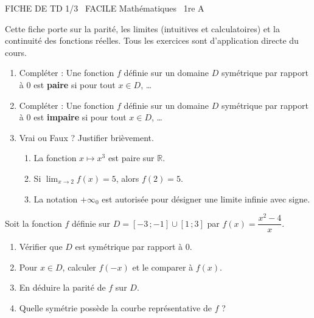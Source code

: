 \documentclass[11pt]{article}
\begin{document}
\begin{tcolorbox}[enhanced,colback=popink,colframe=popink,arc=10pt,boxrule=0pt,left=12pt,right=12pt,top=9pt,bottom=9pt]
{\color{white}\popxbold\small FICHE DE TD 1/3 \textbullet\ FACILE \hfill Mathématiques \textbullet\ 1re A\par}
\end{tcolorbox}
\vspace{4pt}
\noindent Cette fiche porte sur la parité, les limites (intuitives et calculatoires) et la continuité des fonctions réelles. Tous les exercices sont d'application directe du cours.

\begin{exercice}
\begin{enumerate}
    \item Compléter : Une fonction $f$ définie sur un domaine $D$ symétrique par rapport à $0$ est \textbf{paire} si pour tout $x \in D$, \dots
    \item Compléter : Une fonction $f$ définie sur un domaine $D$ symétrique par rapport à $0$ est \textbf{impaire} si pour tout $x \in D$, \dots
    \item Vrai ou Faux ? Justifier brièvement.
    \begin{enumerate}
        \item La fonction $x \mapsto x^3$ est paire sur $\mathbb{R}$.
        \item Si $\lim_{x \to 2} f(x) = 5$, alors $f(2)=5$.
        \item La notation $+\infty_0$ est autorisée pour désigner une limite infinie avec signe.
    \end{enumerate}
\end{enumerate}
\end{exercice}

\begin{exercice}
Soit la fonction $f$ définie sur $D = [-3\,; -1] \cup [1\,; 3]$ par $f(x) = \dfrac{x^2 - 4}{x}$.
\begin{enumerate}
    \item Vérifier que $D$ est symétrique par rapport à $0$.
    \item Pour $x \in D$, calculer $f(-x)$ et le comparer à $f(x)$.
    \item En déduire la parité de $f$ sur $D$.
    \item Quelle symétrie possède la courbe représentative de $f$ ?
\end{enumerate}
\end{exercice}
\end{document}
